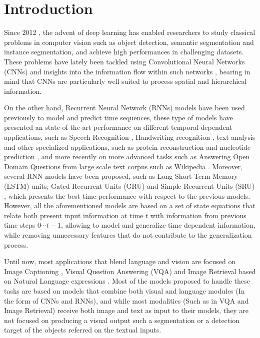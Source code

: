 \chapter{Introduction}
\label{introduction}
Since 2012 \cite{krizhevsky2012imagenet}, the advent of deep learning has enabled researchers to study classical problems in computer vision such as object detection, semantic segmentation and instance segmentation, and achieve high performances in challenging datasets. These problems have lately been tackled using Convolutional Neural Networks (CNNs) \cite{DBLP:journals/corr/LongSD14}\cite{zhao2017pspnet}\cite{he_mask_2017} and insights into the information flow within such networks \cite{DBLP:journals/corr/HeZRS15}\cite{DBLP:journals/corr/HuangLW16a}, bearing in mind that CNNs are particularly well suited to process spatial and hierarchical information. 

On the other hand, Recurrent Neural Network (RNNs) models have been used previously to model and predict time sequences, these type of models have presented an state-of-the-art performance on different temporal-dependent applications, such as Speech Recognition \cite{DBLP:journals/corr/abs-1303-5778}, Handwriting recognition \cite{DBLP:journals/corr/Graves13}, text analysis and other specialized applications, such as protein reconstruction and nucleotide prediction \cite{doi:10.1093/bioinformatics/btw678}, and more recently on more advanced tasks such as Answering Open Domain Questions from large scale text corpus such as Wikipedia \cite{chen2017reading}. Moreover, several RNN models have been proposed, such as Long Short Term Memory (LSTM) \cite{Hochreiter:1997:LSM:1246443.1246450} units, Gated Recurrent Units (GRU) \cite{DBLP:journals/corr/ChoMGBSB14} and Simple Recurrent Units (SRU) \cite{DBLP:journals/corr/abs-1709-02755}, which presents the best time performance with respect to the previous models. However, all the aforementioned models are based on a set of state equations that relate both present input information at time $t$ with information from previous time steps $0 \cdots t-1$, allowing to model and generalize time dependent information, while removing unnecessary features that do not contribute to the generalization process.

Until now, most applications that blend language and vision are focused on Image Captioning \cite{DBLP:journals/corr/JohnsonKL15} \cite{DBLP:journals/corr/MaoHTCYM15} \cite{hendricks_deep_2015} \cite{gan_semantic_2016} \cite{johnson_densecap:_2016} \cite{yang_review_2016}, Visual Question Answering (VQA)  \cite{DBLP:journals/corr/ZhuGBF15} \cite{agrawal_vqa:_2015} \cite {goyal_making_2016} \cite{johnson_inferring_2017} \cite{teney_graph-structured_2016} and Image Retrieval based on Natural Language expressions \cite{hu_natural_2015} \cite{guadarrama_understanding_2016}. Most of the models proposed to handle these tasks are based on models that combine both visual and language modules (In the form of CNNs and RNNs), and while most modalities (Such as in VQA and Image Retrieval) receive both image and text as input to their models, they are not focused on producing a visual output such a segmentation or a detection target of the objects referred on the textual inputs.

